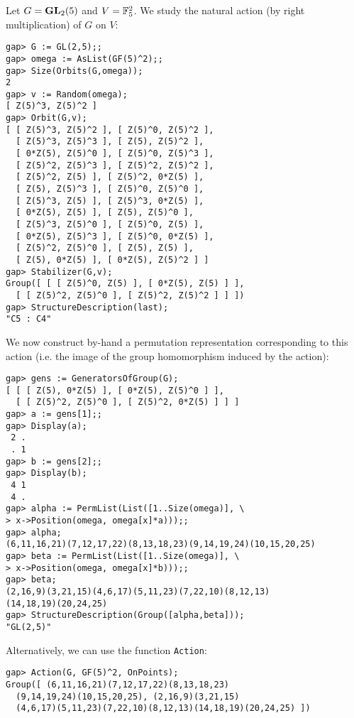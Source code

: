 \begin{example}
    Let $G=\mathbf{GL}_2(5)$ and $V=\mathbb{F}_5^2$. We study 
    the natural action (by right multiplication) 
    of $G$ on $V$:
\begin{lstlisting}
gap> G := GL(2,5);;
gap> omega := AsList(GF(5)^2);;
gap> Size(Orbits(G,omega));
2
gap> v := Random(omega);
[ Z(5)^3, Z(5)^2 ]
gap> Orbit(G,v);
[ [ Z(5)^3, Z(5)^2 ], [ Z(5)^0, Z(5)^2 ],
  [ Z(5)^3, Z(5)^3 ], [ Z(5), Z(5)^2 ],
  [ 0*Z(5), Z(5)^0 ], [ Z(5)^0, Z(5)^3 ],
  [ Z(5)^2, Z(5)^3 ], [ Z(5)^2, Z(5)^2 ],
  [ Z(5)^2, Z(5) ], [ Z(5)^2, 0*Z(5) ],
  [ Z(5), Z(5)^3 ], [ Z(5)^0, Z(5)^0 ],
  [ Z(5)^3, Z(5) ], [ Z(5)^3, 0*Z(5) ],
  [ 0*Z(5), Z(5) ], [ Z(5), Z(5)^0 ],
  [ Z(5)^3, Z(5)^0 ], [ Z(5)^0, Z(5) ],
  [ 0*Z(5), Z(5)^3 ], [ Z(5)^0, 0*Z(5) ],
  [ Z(5)^2, Z(5)^0 ], [ Z(5), Z(5) ],
  [ Z(5), 0*Z(5) ], [ 0*Z(5), Z(5)^2 ] ]
gap> Stabilizer(G,v);
Group([ [ [ Z(5)^0, Z(5) ], [ 0*Z(5), Z(5) ] ],
  [ [ Z(5)^2, Z(5)^0 ], [ Z(5)^2, Z(5)^2 ] ] ])
gap> StructureDescription(last);
"C5 : C4"  
\end{lstlisting}
We now construct by-hand a permutation representation
corresponding to this action (i.e. the image of the
group homomorphism induced by the action):
\begin{lstlisting}
gap> gens := GeneratorsOfGroup(G);
[ [ [ Z(5), 0*Z(5) ], [ 0*Z(5), Z(5)^0 ] ],
  [ [ Z(5)^2, Z(5)^0 ], [ Z(5)^2, 0*Z(5) ] ] ]
gap> a := gens[1];;
gap> Display(a);
 2 .
 . 1
gap> b := gens[2];;
gap> Display(b);
 4 1
 4 .
gap> alpha := PermList(List([1..Size(omega)], \ 
> x->Position(omega, omega[x]*a)));;
gap> alpha;
(6,11,16,21)(7,12,17,22)(8,13,18,23)(9,14,19,24)(10,15,20,25)
gap> beta := PermList(List([1..Size(omega)], \ 
> x->Position(omega, omega[x]*b)));;
gap> beta;
(2,16,9)(3,21,15)(4,6,17)(5,11,23)(7,22,10)(8,12,13)
(14,18,19)(20,24,25)
gap> StructureDescription(Group([alpha,beta]));
"GL(2,5)"
\end{lstlisting}
Alternatively, we can use the function \lstinline{Action}:
\begin{lstlisting}
gap> Action(G, GF(5)^2, OnPoints);
Group([ (6,11,16,21)(7,12,17,22)(8,13,18,23)
  (9,14,19,24)(10,15,20,25), (2,16,9)(3,21,15)
  (4,6,17)(5,11,23)(7,22,10)(8,12,13)(14,18,19)(20,24,25) ])
\end{lstlisting}
\end{example}

